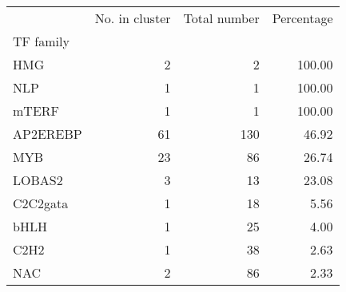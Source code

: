 \begin{tabular}{lrrr}
\toprule
{} &  No. in cluster &  Total number &  Percentage \\
TF family &                 &               &             \\
\midrule
HMG       &               2 &             2 &      100.00 \\
NLP       &               1 &             1 &      100.00 \\
mTERF     &               1 &             1 &      100.00 \\
AP2EREBP  &              61 &           130 &       46.92 \\
MYB       &              23 &            86 &       26.74 \\
LOBAS2    &               3 &            13 &       23.08 \\
C2C2gata  &               1 &            18 &        5.56 \\
bHLH      &               1 &            25 &        4.00 \\
C2H2      &               1 &            38 &        2.63 \\
NAC       &               2 &            86 &        2.33 \\
\bottomrule
\end{tabular}
